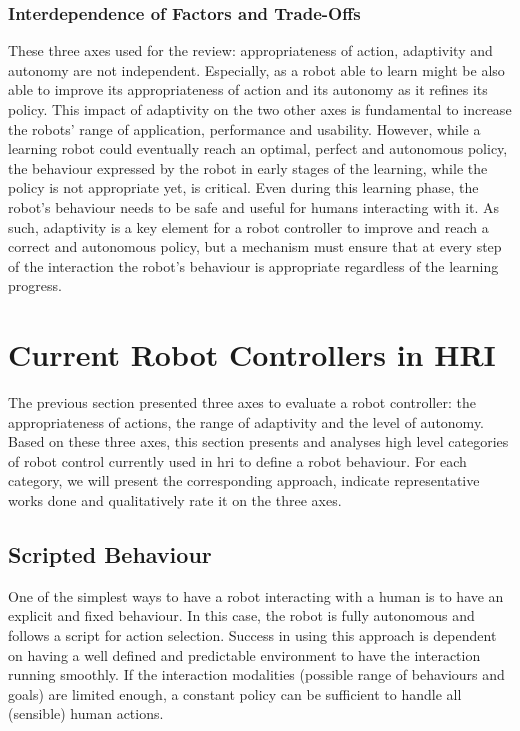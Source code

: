 \subsubsection{Interdependence of Factors and Trade-Offs}

These three axes used for the review: appropriateness of action, adaptivity and autonomy are not independent. Especially, as a robot able to learn might be also able to improve its appropriateness of action and its autonomy as it refines its policy. This impact of adaptivity on the two other axes is fundamental to increase the robots' range of application, performance and usability. However, while a learning robot could eventually reach an optimal, perfect and autonomous policy, the behaviour expressed by the robot in early stages of the learning, while the policy is not appropriate yet, is critical. Even during this learning phase, the robot's behaviour needs to be safe and useful for humans interacting with it. As such, adaptivity is a key element for a robot controller to improve and reach a correct and autonomous policy, but a mechanism must ensure that at every step of the interaction the robot's behaviour is appropriate regardless of the learning progress.

\section{Current Robot Controllers in HRI} \label{sec:back_behaviour}

The previous section presented three axes to evaluate a robot controller: the appropriateness of actions, the range of adaptivity and the level of autonomy. Based on these three axes, this section presents and analyses high level categories of robot control currently used in \gls{hri} to define a robot behaviour. 
For each category, we will present the corresponding approach, indicate representative works done and qualitatively rate it on the three axes.

\subsection{Scripted Behaviour}

One of the simplest ways to have a robot interacting with a human is to have an explicit and fixed behaviour. In this case, the robot is fully autonomous and follows a script for action selection. Success in using this approach is dependent on having a well defined and predictable environment to have the interaction running smoothly. If the interaction modalities (possible range of behaviours and goals) are limited enough, a constant policy can be sufficient to handle all (sensible) human actions. 

